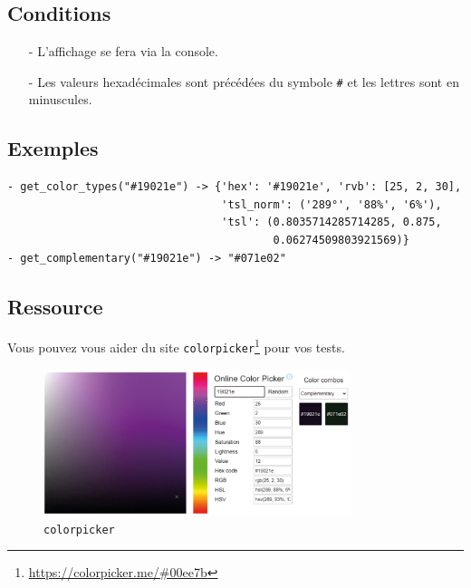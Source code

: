 \subsection*{Conditions}
\begin{itemize}
	\item[-] L'affichage se fera via la console.
	\item[-] Les valeurs hexadécimales sont précédées du symbole \og \texttt{\#}\fg{} et les lettres sont en minuscules.
\end{itemize}
\medskip

\subsection*{Exemples}
\begin{verbatim}
- get_color_types("#19021e") -> {'hex': '#19021e', 'rvb': [25, 2, 30],
                                 'tsl_norm': ('289°', '88%', '6%'), 
                                 'tsl': (0.8035714285714285, 0.875,
                                         0.06274509803921569)}
- get_complementary("#19021e") -> "#071e02"
\end{verbatim}
\medskip

\subsection*{Ressource}
Vous pouvez vous aider du site \texttt{colorpicker}\footnote{\url{https://colorpicker.me/\#00ee7b}} pour vos tests. 
\medskip

\begin{figure}[h]
    \centering
    \includegraphics[width=0.8\textwidth]{IMG/color_picker.png}
    \caption{\texttt{colorpicker}}
    \label{fig:colorpicker}
\end{figure}

